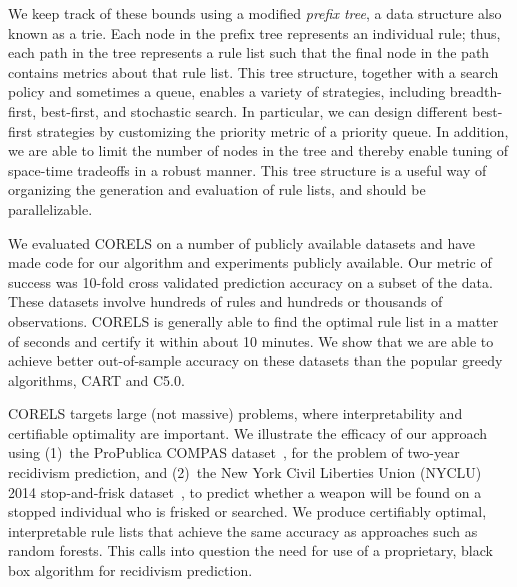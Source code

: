We keep track of these bounds using a modified \emph{prefix tree},
a data structure also known as a trie.
%
Each node in the prefix tree represents an individual rule;
thus, each path in the tree represents a rule list such that
the final node in the path contains metrics about that rule list.
%
This tree structure, together with a search policy and sometimes a queue,
enables a variety of strategies, including breadth-first,
best-first, and stochastic search.
%
In particular, we can design different best-first strategies
by customizing the priority metric of a priority queue.
%
In addition, we are able to limit the number of nodes in the tree
and thereby enable tuning of space-time tradeoffs in a robust manner.
%
This tree structure is a useful way of organizing the generation
and evaluation of rule lists, and should be parallelizable.

\begin{arxiv}
We evaluated CORELS on a number of publicly available datasets and have made code for our algorithm and experiments publicly available. Our metric of success was 10-fold cross validated prediction accuracy on a subset of the data. These datasets involve hundreds of rules and hundreds or thousands of observations. CORELS is generally able to find the optimal rule list in a matter of seconds and certify it within about 10 minutes. We show that we are able to achieve better out-of-sample accuracy on these datasets than the popular greedy algorithms, CART and C5.0.
\end{arxiv}

CORELS targets large (not massive) problems,
where interpretability and certifiable optimality are important.
%
We illustrate the efficacy of our approach using (1)~the ProPublica COMPAS dataset~\cite{LarsonMaKiAn16}, for the problem of two-year recidivism prediction,
and (2)~the New York Civil Liberties Union (NYCLU) 2014 stop-and-frisk
dataset~\cite{nyclu:2014}, to predict whether a weapon will be found
on a stopped individual who is frisked or searched.
%
We produce certifiably optimal, interpretable rule lists that achieve
the same accuracy as approaches such as random forests.
%
This calls into question the need for use of a proprietary,
black box algorithm for recidivism prediction.

%
%
%
%
